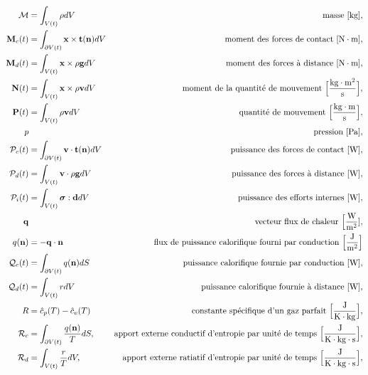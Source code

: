 \begin{align*}
      \mathcal{M} & = \int_{V(t)} \rho dV  & \textrm{masse [\si{kg}],}\\
      \mathcal{\vb{M}}_c (t) &= \int_{\partial V(t)} \vb{x} \times \vb{t}(\vb{n}) dV & \textrm{moment des forces de contact } [\si{N \cdot m}],\\
      \mathcal{\vb{M}}_d (t) &= \int_{V(t)} \vb{x} \times \rho \vb{g} dV & \textrm{moment des forces à distance } [\si{N \cdot m}],\\
      \mathcal{\vb{N}}(t) &= \int_{V(t)} \vb{x} \times \rho \vb{v} dV & \textrm{moment de la quantité de mouvement } \Big[\si{\frac{kg \cdot  m^2}{s}}\Big],\\
      \mathcal{\vb{P}}(t) &= \int_{V(t)} \rho \vb{v} dV & \textrm{quantité de mouvement } \Big[\si{\frac{kg \cdot m}{s}}\Big],\\
      p & & \textrm{pression } [\si{Pa}],\\
      \mathcal{P}_c(t) &= \int_{\partial V(t)} \vb{v} \cdot \vb{t}(\vb{n}) dV & \textrm{puissance des forces de contact } [\si{W}], \\
      \mathcal{P}_d(t) &= \int_{V(t)} \vb{v} \cdot \rho \vb{g} dV & \textrm{puissance des forces à distance } [\si{W}], \\
      \mathcal{P}_i(t) &= \int_{V(t)} \bs{\sigma} : \vb{d} dV & \textrm{puissance des efforts internes } [\si{W}],\\
      \vb{q} & & \textrm{vecteur flux de chaleur } \Big[\si{\frac{W}{m^2}}], \\
      q(\vb{n}) &= - \vb{q} \cdot \vb{n} & \textrm{flux de puissance calorifique fourni par conduction } \Big[\si{\frac{J}{m^2}}\Big]\\
      \mathcal{Q}_c(t) &= \int_{\partial V(t)} q(\vb{n}) dS & \textrm{puissance calorifique fournie par conduction } [\si{W}], \\
      \mathcal{Q}_d(t) &= \int_{V(t)} r dV & \textrm{puissance calorifique fournie à distance } [\si{W}], \\
      R &= \hat{c}_p(T) - \hat{c}_v(T) & \textrm{constante spécifique d'un gaz parfait } \Big[\si{\frac{J}{K \cdot kg}}\Big],\\
      \mathcal{R}_c &= \int_{\partial V(t)} \frac{q(\vb{n})}{T}dS, & \textrm{apport externe conductif d'entropie par unité de temps }\Big[\si{\frac{J}{K \cdot kg \cdot \s}}\Big],\\
      \mathcal{R}_d &= \int_{V(t)} \frac{r}{T} dV, & \textrm{apport externe ratiatif d'entropie par unité de temps }\Big[\si{\frac{J}{K \cdot kg \cdot s}}\Big],\\

\end{align*}
